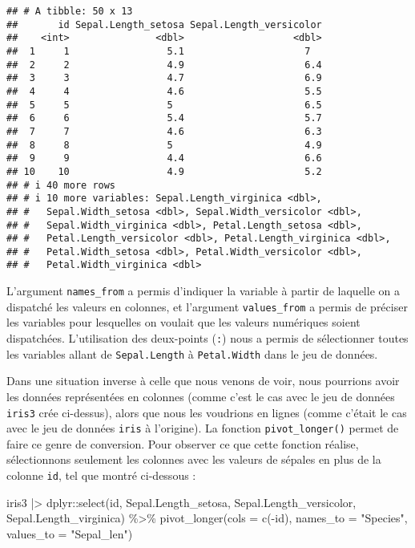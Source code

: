 \documentclass[
]{book}
\newenvironment{Shaded}{\begin{snugshade}}{\end{snugshade}}
\newcommand{\AttributeTok}[1]{\textcolor[rgb]{0.77,0.63,0.00}{#1}}
\newcommand{\FunctionTok}[1]{\textcolor[rgb]{0.00,0.00,0.00}{#1}}
\newcommand{\NormalTok}[1]{#1}
\newcommand{\SpecialCharTok}[1]{\textcolor[rgb]{0.00,0.00,0.00}{#1}}
\newcommand{\StringTok}[1]{\textcolor[rgb]{0.31,0.60,0.02}{#1}}
\begin{document}
\begin{verbatim}
## # A tibble: 50 x 13
##       id Sepal.Length_setosa Sepal.Length_versicolor
##    <int>               <dbl>                   <dbl>
##  1     1                 5.1                     7  
##  2     2                 4.9                     6.4
##  3     3                 4.7                     6.9
##  4     4                 4.6                     5.5
##  5     5                 5                       6.5
##  6     6                 5.4                     5.7
##  7     7                 4.6                     6.3
##  8     8                 5                       4.9
##  9     9                 4.4                     6.6
## 10    10                 4.9                     5.2
## # i 40 more rows
## # i 10 more variables: Sepal.Length_virginica <dbl>,
## #   Sepal.Width_setosa <dbl>, Sepal.Width_versicolor <dbl>,
## #   Sepal.Width_virginica <dbl>, Petal.Length_setosa <dbl>,
## #   Petal.Length_versicolor <dbl>, Petal.Length_virginica <dbl>,
## #   Petal.Width_setosa <dbl>, Petal.Width_versicolor <dbl>,
## #   Petal.Width_virginica <dbl>
\end{verbatim}

L'argument \texttt{names\_from} a permis d'indiquer la variable à partir de laquelle on a dispatché les valeurs en colonnes, et l'argument \texttt{values\_from} a permis de préciser les variables pour lesquelles on voulait que les valeurs numériques soient dispatchées. L'utilisation des deux-points (\texttt{:}) nous a permis de sélectionner toutes les variables allant de \texttt{Sepal.Length} à \texttt{Petal.Width} dans le jeu de données.

Dans une situation inverse à celle que nous venons de voir, nous pourrions avoir les données représentées en colonnes (comme c'est le cas avec le jeu de données \texttt{iris3} crée ci-dessus), alors que nous les voudrions en lignes (comme c'était le cas avec le jeu de données \texttt{iris} à l'origine). La fonction \texttt{pivot\_longer()} permet de faire ce genre de conversion. Pour observer ce que cette fonction réalise, sélectionnons seulement les colonnes avec les valeurs de sépales en plus de la colonne \texttt{id}, tel que montré ci-dessous :

\begin{Shaded}
\begin{Highlighting}[]
\NormalTok{iris3 }\SpecialCharTok{|\textgreater{}} 
\NormalTok{  dplyr}\SpecialCharTok{::}\FunctionTok{select}\NormalTok{(id,}
\NormalTok{                Sepal.Length\_setosa,}
\NormalTok{                Sepal.Length\_versicolor,}
\NormalTok{                Sepal.Length\_virginica) }\SpecialCharTok{\%\textgreater{}\%}
  \FunctionTok{pivot\_longer}\NormalTok{(}\AttributeTok{cols =} \FunctionTok{c}\NormalTok{(}\SpecialCharTok{{-}}\NormalTok{id),}
               \AttributeTok{names\_to =} \StringTok{"Species"}\NormalTok{,}
               \AttributeTok{values\_to =} \StringTok{"Sepal\_len"}\NormalTok{)}
\end{Highlighting}
\end{Shaded}
\end{document}
